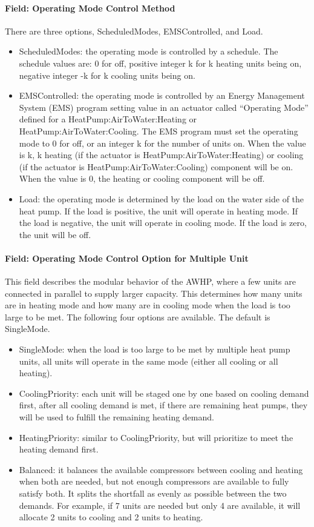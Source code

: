 \paragraph{Field: Operating Mode Control Method} There are three options,
ScheduledModes, EMSControlled, and Load.
\begin{itemize}
\item ScheduledModes: the operating mode is controlled by a schedule. The
schedule values are: 0 for off, positive integer k for k heating units being on,
negative integer -k for k cooling units being on.
\item EMSControlled: the operating mode is controlled by an Energy Management
System (EMS) program setting value in an actuator called ``Operating Mode''
defined for a HeatPump:AirToWater:Heating or HeatPump:AirToWater:Cooling. The
EMS program must set the operating mode to 0 for off, or an integer k for the
number of units on. When the value is k, k heating (if the actuator is HeatPump:AirToWater:Heating) 
or cooling (if the actuator is HeatPump:AirToWater:Cooling) component will be on. 
When the value is 0, the heating or cooling component will be off.
\item Load: the operating mode is determined by the load on the water side of
the heat pump. If the load is positive, the unit will operate in heating mode.
If the load is negative, the unit will operate in cooling mode. If the load is
zero, the unit will be off.
\end{itemize}
\paragraph{Field: Operating Mode Control Option for Multiple Unit} 
This field describes the modular behavior of the AWHP, where a few units are
connected in parallel to supply larger capacity. This determines how many units
are in heating mode and how many are in cooling mode when the load is too large
to be met. The following four options are available. The default is SingleMode.
\begin{itemize}
    \item SingleMode: when the load is too large to be met by multiple heat pump
units, all units will operate in the same mode (either all cooling or all
heating).
    \item CoolingPriority: each unit will be staged one by one based on cooling
demand first, after all cooling demand is met, if there are remaining heat
pumps, they will be used to fulfill the remaining heating demand.
\item HeatingPriority: similar to CoolingPriority, but will prioritize to meet
  the heating demand first.
\item Balanced: it balances the available compressors between cooling and heating
  when both are needed, but not enough compressors are available to fully
  satisfy both. It splits the shortfall as evenly as possible between the two
  demands. For example, if 7 units are needed but only 4 are available, it will
  allocate 2 units to cooling and 2 units to heating.
\end{itemize}
